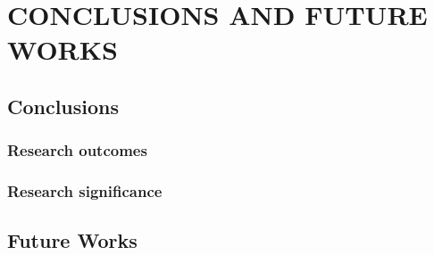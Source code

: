 \chapter{CONCLUSIONS AND FUTURE WORKS}
\label{chap6:conclusion}

\section{Conclusions}
\label{main-conclusions}


\subsection{Research outcomes}
\label{subsecChap1:contribution}



\subsection{Research significance}
\label{subsecChap1:significance}

\section{Future Works}
\label{sec-future-challenge}
